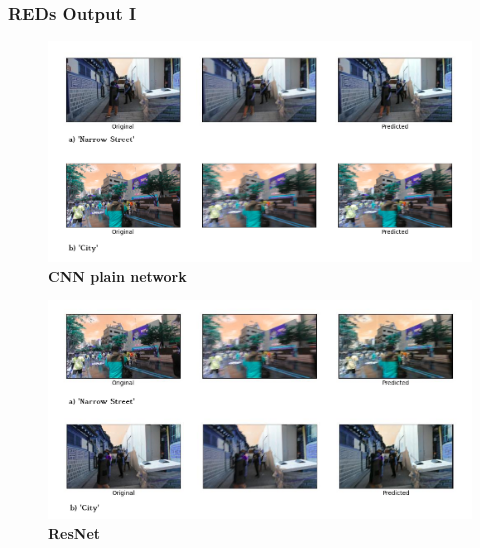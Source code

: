 \documentclass [handout] {beamer}
\begin{document}
\begin{frame}
	\frametitle{REDs Output I}
	\begin{figure}
		\centering
		\includegraphics[scale=0.22]{REDs_CNNBase_Outputs.png}
		\tiny{\caption{\textbf{CNN plain network}}}
	\end{figure}		
	
	\begin{figure}
		\centering
		\includegraphics[scale=0.22]{REDs_ResNet_Outputs.png}
		\tiny{\caption{\textbf{ResNet}}}
	\end{figure}		

\end{frame}
\end{document}
